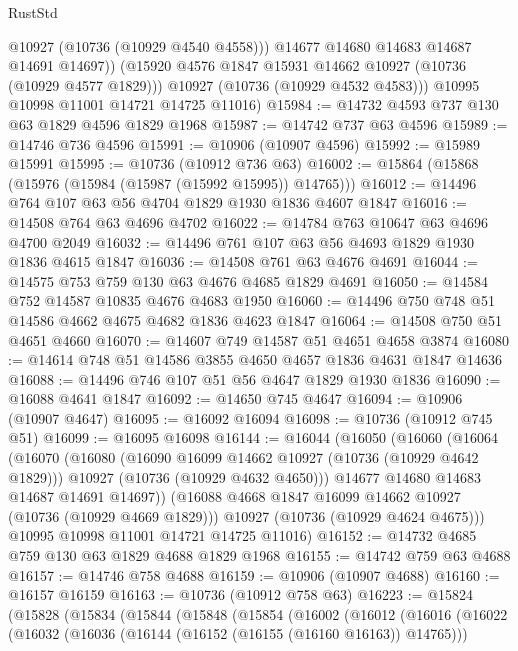 \begin{lexlean}{RustStd}
\begin{coremodule}
              @10927
              (@10736 (@10929 @4540 @4558)))
            @14677
            @14680
            @14683
            @14687
            @14691
            @14697))
        (@15920 @4576 @1847 @15931 @14662 @10927 (@10736 (@10929 @4577 @1829)))
        @10927
        (@10736 (@10929 @4532 @4583)))
      @10995
      @10998
      @11001
      @14721
      @14725
      @11016)
@15984 := @14732 @4593 @737 @130 @63 @1829 @4596 @1829 @1968
@15987 := @14742 @737 @63 @4596
@15989 := @14746 @736 @4596
@15991 := @10906 (@10907 @4596)
@15992 := @15989 @15991
@15995 := @10736 (@10912 @736 @63)
@16002 := @15864 (@15868 (@15976 (@15984 (@15987 (@15992 @15995)) @14765)))
@16012 := @14496 @764 @107 @63 @56 @4704 @1829 @1930 @1836 @4607 @1847
@16016 := @14508 @764 @63 @4696 @4702
@16022 := @14784 @763 @10647 @63 @4696 @4700 @2049
@16032 := @14496 @761 @107 @63 @56 @4693 @1829 @1930 @1836 @4615 @1847
@16036 := @14508 @761 @63 @4676 @4691
@16044 := @14575 @753 @759 @130 @63 @4676 @4685 @1829 @4691
@16050 := @14584 @752 @14587 @10835 @4676 @4683 @1950
@16060 := @14496 @750 @748 @51 @14586 @4662 @4675 @4682 @1836 @4623 @1847
@16064 := @14508 @750 @51 @4651 @4660
@16070 := @14607 @749 @14587 @51 @4651 @4658 @3874
@16080 := @14614 @748 @51 @14586 @3855 @4650 @4657 @1836 @4631 @1847 @14636
@16088 := @14496 @746 @107 @51 @56 @4647 @1829 @1930 @1836
@16090 := @16088 @4641 @1847
@16092 := @14650 @745 @4647
@16094 := @10906 (@10907 @4647)
@16095 := @16092 @16094
@16098 := @10736 (@10912 @745 @51)
@16099 := @16095 @16098
@16144 := @16044
    (@16050
      (@16060
        (@16064
          (@16070
            (@16080
              (@16090 @16099 @14662 @10927 (@10736 (@10929 @4642 @1829)))
              @10927
              (@10736 (@10929 @4632 @4650)))
            @14677
            @14680
            @14683
            @14687
            @14691
            @14697))
        (@16088 @4668 @1847 @16099 @14662 @10927 (@10736 (@10929 @4669 @1829)))
        @10927
        (@10736 (@10929 @4624 @4675)))
      @10995
      @10998
      @11001
      @14721
      @14725
      @11016)
@16152 := @14732 @4685 @759 @130 @63 @1829 @4688 @1829 @1968
@16155 := @14742 @759 @63 @4688
@16157 := @14746 @758 @4688
@16159 := @10906 (@10907 @4688)
@16160 := @16157 @16159
@16163 := @10736 (@10912 @758 @63)
@16223 := @15824
    (@15828
      (@15834
        (@15844
          (@15848
            (@15854
              (@16002
                (@16012
                  (@16016
                    (@16022
                      (@16032
                        (@16036 (@16144 (@16152 (@16155 (@16160 @16163)) @14765)))

\end{coremodule}
\end{lexlean}
